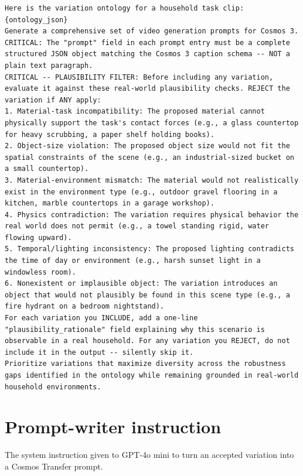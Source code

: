 \begin{lstlisting}
Here is the variation ontology for a household task clip:
{ontology_json}
Generate a comprehensive set of video generation prompts for Cosmos 3.
CRITICAL: The "prompt" field in each prompt entry must be a complete structured JSON object matching the Cosmos 3 caption schema -- NOT a plain text paragraph.
CRITICAL -- PLAUSIBILITY FILTER: Before including any variation, evaluate it against these real-world plausibility checks. REJECT the variation if ANY apply:
1. Material-task incompatibility: The proposed material cannot physically support the task's contact forces (e.g., a glass countertop for heavy scrubbing, a paper shelf holding books).
2. Object-size violation: The proposed object size would not fit the spatial constraints of the scene (e.g., an industrial-sized bucket on a small countertop).
3. Material-environment mismatch: The material would not realistically exist in the environment type (e.g., outdoor gravel flooring in a kitchen, marble countertops in a garage workshop).
4. Physics contradiction: The variation requires physical behavior the real world does not permit (e.g., a towel standing rigid, water flowing upward).
5. Temporal/lighting inconsistency: The proposed lighting contradicts the time of day or environment (e.g., harsh sunset light in a windowless room).
6. Nonexistent or implausible object: The variation introduces an object that would not plausibly be found in this scene type (e.g., a fire hydrant on a bedroom nightstand).
For each variation you INCLUDE, add a one-line "plausibility_rationale" field explaining why this scenario is observable in a real household. For any variation you REJECT, do not include it in the output -- silently skip it.
Prioritize variations that maximize diversity across the robustness gaps identified in the ontology while remaining grounded in real-world household environments.
\end{lstlisting}

\section{Prompt-writer instruction}
\label{app:writer}
The system instruction given to GPT-4o mini to turn an accepted variation into a Cosmos Transfer prompt.

